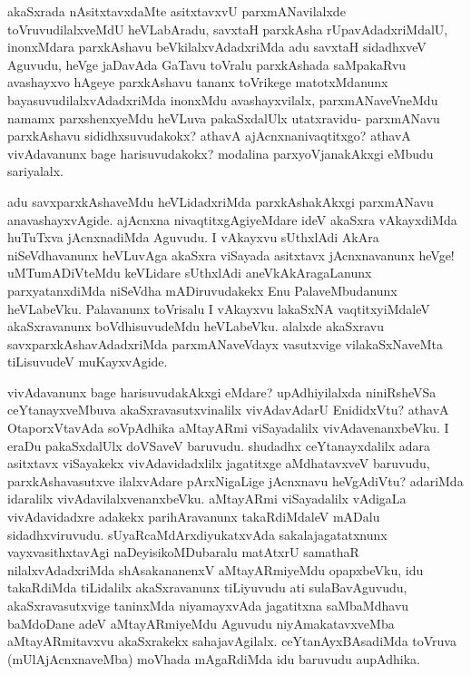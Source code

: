 \begin{artha}
akaSxrada nAsitxtavxdaMte asitxtavxvU parxmANavilalxde toVruvudilalxveMdU heVLabAradu, savxtaH parxkAsha rUpavAdadxriMdalU, inonxMdara parxkAshavu beVkilalxvAdadxriMda adu savxtaH sidadhxveV Aguvudu, heVge jaDavAda GaTavu toVralu parxkAshada saMpakaRvu avashayxvo hAgeye parxkAshavu tananx toVrikege matotxMdanunx bayasuvudilalxvAdadxriMda inonxMdu avashayxvilalx, parxmANaveVneMdu namamx parxshenxyeMdu heVLuva pakaSxdalUlx utatxravidu- parxmANavu parxkAshavu sididhxsuvudakokx? athavA ajAcnxnanivaqtitxgo? athavA vivAdavanunx bage harisuvudakokx? modalina parxyoVjanakAkxgi eMbudu sariyalalx. 
\end{artha}

\begin{artha}
adu savxparxkAshaveMdu heVLidadxriMda parxkAshakAkxgi parxmANavu anavashayxvAgide. ajAcnxna nivaqtitxgAgiyeMdare ideV akaSxra vAkayxdiMda huTuTxva jAcnxnadiMda Aguvudu. I vAkayxvu sUthxlAdi AkAra niSeVdhavanunx heVLuvAga akaSxra viSayada asitxtavx jAcnxnavanunx heVge! uMTumADiVteMdu keVLidare sUthxlAdi aneVkAkAragaLanunx parxyatanxdiMda niSeVdha mADiruvudakekx Enu PalaveMbudanunx heVLabeVku. Palavanunx toVrisalu I vAkayxvu lakaSxNA vaqtitxyiMdaleV akaSxravanunx boVdhisuvudeMdu heVLabeVku. alalxde akaSxravu savxparxkAshavAdadxriMda parxmANaveVdayx vasutxvige vilakaSxNaveMta tiLisuvudeV muKayxvAgide.
\end{artha}%

\begin{artha}
vivAdavanunx bage harisuvudakAkxgi eMdare? upAdhiyilalxda niniRsheVSa ceYtanayxveMbuva akaSxravasutxvinalilx vivAdavAdarU EnididxVtu? athavA OtaporxVtavAda soVpAdhika aMtayARmi viSayadalilx vivAdavenanxbeVku. I eraDu pakaSxdalUlx doVSaveV baruvudu. shudadhx ceYtanayxdalilx adara asitxtavx viSayakekx vivAdavidadxlilx jagatitxge aMdhatavxveV baruvudu, parxkAshavasutxve ilalxvAdare pArxNigaLige jAcnxnavu heVgAdiVtu? adariMda idaralilx vivAdavilalxvenanxbeVku. aMtayARmi viSayadalilx vAdigaLa vivAdavidadxre adakekx parihAravanunx takaRdiMdaleV mADalu sidadhxviruvudu. sUyaRcaMdArxdiyukatxvAda sakalajagatatxnunx vayxvasithxtavAgi naDeyisikoMDubaralu matAtxrU samathaR nilalxvAdadxriMda shAsakananenxV aMtayARmiyeMdu opapxbeVku, idu takaRdiMda tiLidalilx akaSxravanunx tiLiyuvudu ati sulaBavAguvudu, akaSxravasutxvige taninxMda niyamayxvAda jagatitxna saMbaMdhavu baMdoDane adeV aMtayARmiyeMdu Aguvudu niyAmakatavxveMba aMtayARmitavxvu akaSxrakekx sahajavAgilalx. ceYtanAyxBAsadiMda toVruva (mUlAjAcnxnaveMba) moVhada mAgaRdiMda idu baruvudu aupAdhika.
\end{artha}

